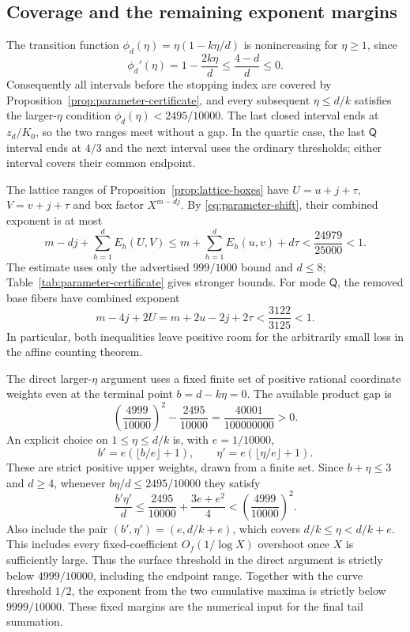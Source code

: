 \subsection{Coverage and the remaining exponent margins}

The transition function $\phi_d(\eta)=\eta(1-k\eta/d)$ is
nonincreasing for $\eta\ge1$, since
\[
 \phi_d'(\eta)=1-\frac{2k\eta}{d}
 \le\frac{4-d}{d}\le0.
\]
Consequently all intervals before the stopping index are covered by
Proposition~\ref{prop:parameter-certificate}, and every subsequent
$\eta\le d/k$ satisfies the larger-$\eta$ condition
$\phi_d(\eta)<2495/10000$.  The last closed interval ends at
$z_d/K_0$, so the two ranges meet without a gap.  In the quartic case,
the last $\mathsf Q$ interval ends at $4/3$ and the next interval
uses the ordinary thresholds; either interval covers their common
endpoint.

The lattice ranges of Proposition~\ref{prop:lattice-boxes} have
$U=u+j+\tau$, $V=v+j+\tau$ and box factor $X^{m-dj}$.
By \eqref{eq:parameter-shift}, their combined exponent is at most
\begin{equation}
 m-dj+\sum_{h=1}^dE_h(U,V)
 \le m+\sum_{h=1}^dE_h(u,v)+d\tau
 <\frac{24979}{25000}<1.
 \label{eq:parameter-final-box-exponent}
\end{equation}
The estimate uses only the advertised $999/1000$ bound and $d\le8$;
Table~\ref{tab:parameter-certificate} gives stronger bounds.  For
mode $\mathsf Q$, the removed base fibers have combined exponent
\begin{equation}
 m-4j+2U=m+2u-2j+2\tau
 <\frac{3122}{3125}<1.
 \label{eq:parameter-fiber-exponent}
\end{equation}
In particular, both inequalities leave positive room for the
arbitrarily small loss in the affine counting theorem.

The direct larger-$\eta$ argument uses a fixed
finite set of positive rational coordinate weights even at the
terminal point $b=d-k\eta=0$.  The available product gap is
\begin{equation}
 \left(\frac{4999}{10000}\right)^2-\frac{2495}{10000}
 =\frac{40001}{100000000}>0.
 \label{eq:parameter-large-eta-gap}
\end{equation}
An explicit choice on $1\le\eta\le d/k$ is, with $e=1/10000$,
\[
 b'=e(\lfloor b/e\rfloor+1),\qquad
 \eta'=e(\lfloor\eta/e\rfloor+1).
\]
These are strict positive upper weights, drawn from a finite set.
Since $b+\eta\le3$ and $d\ge4$, whenever
$b\eta/d\le2495/10000$ they satisfy
\[
 \frac{b'\eta'}d
 \le\frac{2495}{10000}+\frac{3e+e^2}{4}
 <\left(\frac{4999}{10000}\right)^2.
\]
Also include the pair $(b',\eta')=(e,d/k+e)$, which covers
$d/k\le\eta<d/k+e$.  This includes every fixed-coefficient
$O_f(1/\log X)$ overshoot once $X$ is sufficiently large.  Thus the
surface threshold in the direct argument is strictly below
$4999/10000$, including the endpoint range.  Together with the curve
threshold $1/2$, the exponent from the two cumulative maxima is
strictly below $9999/10000$.  These fixed margins are the numerical
input for the final tail summation.
